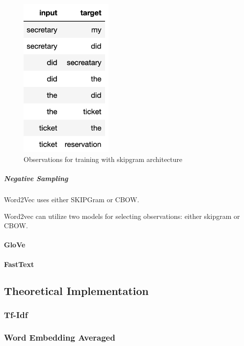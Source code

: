             \begin{figure}[ht]
                \centering
                \includegraphics[height=8cm]{Bilder/word2vec/skipgram.png}
                \caption{Observations for training with skipgram architecture}
                \label{fig:cbow-architecture}
            \end{figure}
            
            
            \subparagraph{Negative Sampling}
            
            
            Word2Vec uses either SKIPGram or CBOW.
            
            Word2vec can utilize two models for selecting observations: either skipgram or \ac{CBOW}. 
            
            \paragraph{GloVe}
            
            \paragraph{FastText}
            
            \subsection{Theoretical Implementation}
            \subsubsection{Tf-Idf}
            \subsubsection{Word Embedding Averaged}
